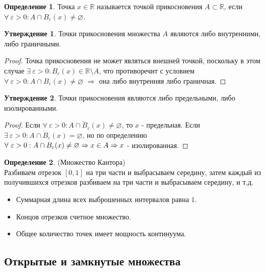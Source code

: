 \documentclass[a4paper, 12pt]{article}
\newcommand{\R}{\mathbb{R}}
\renewcommand{\epsilon}{\varepsilon}
\renewcommand{\emptyset}{\varnothing}
\theoremstyle{definition}
\newtheorem*{definition}{Определение}
\newtheorem*{statement}{Утверждение}
\begin{document}
        \begin{definition}
            Точка $x\in \R$ называется точкой прикосновения $A\subset \R$, если $\forall \ \epsilon>0: A\cap {B}_{\epsilon}(x)\ne\emptyset$.
        \end{definition} 
        \begin{statement}
            Точки прикосновения множества $A$ являются либо внутренними, либо граничными.
        \end{statement}
        \begin{proof}
            Точка прикосновения не может являться внешней точкой, поскольку в этом случае $\exists\ \epsilon>0: B_{\epsilon}(x)\in \R\setminus A$, что противоречит с условием $\forall \ \epsilon>0: A\cap {B}_{\epsilon}(x)\ne\emptyset$
            $\Rightarrow$ она либо внутренняя либо граничная.
        \end{proof}
        \begin{statement}
            Точки прикосновения являются либо предельными, либо изолированными.
        \end{statement}  
        \begin{proof}
            Если $\forall \ \epsilon>0: A\cap \mathring{B}_{\epsilon}(x)\ne\emptyset$, то $x$ - предельная. Если $\exists\ \epsilon > 0: A\cap\mathring{B}_{\epsilon}(x)=\emptyset$, но по определению $\forall \ \epsilon>0: A\cap B_{\epsilon}(x)\ne\emptyset\\
            \Rightarrow x\in A \Rightarrow x$ - изолированная.
        \end{proof} 
        \begin{definition} (Множество Кантора)\\
            Разбиваем отрезок $[0,1]$ на три части и выбрасываем середину, затем каждый из получившихся отрезков разбиваем на три части и выбрасываем середину, и т.д.
            \begin{itemize}
                \item Суммарная длина всех выброшенных интервалов равна $1$.
                \item Концов отрезков счетное множество.
                \item Общее количество точек имеет мощность континуума.
            \end{itemize}
    \subsection{Открытые и замкнутые множества}
        \end{definition} 
\end{document}

